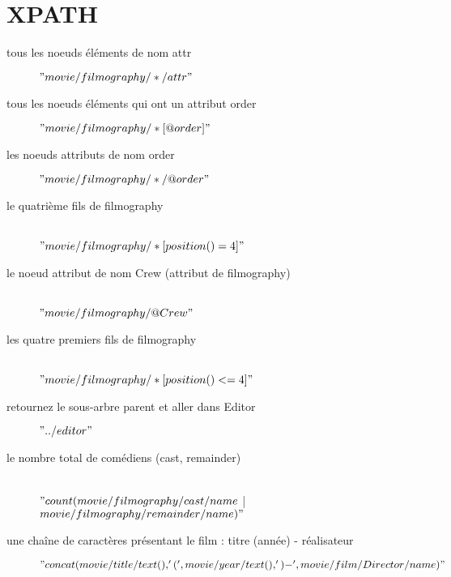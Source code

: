 \chapter{XPATH}

\begin{description}
\item[tous les noeuds éléments de nom attr] $"movie/filmography/*/attr"$
\item[tous les noeuds éléments qui ont un attribut order] $"movie/filmography/*[@order]"$
\item[les noeuds attributs de nom order] $"movie/filmography/*/@order"$
\item[le quatrième fils de filmography]\ \\ $"movie/filmography/*[position()=4]"$
\item[le noeud attribut de nom Crew (attribut de filmography)]\ \\ $"movie/filmography/@Crew"$
\item[les quatre premiers fils de filmography]\ \\ $"movie/filmography/*[position()<=4]"$
\item[retournez le sous-arbre parent et aller dans Editor] $"../editor"$
\item[le nombre total de comédiens (cast, remainder)]\ \\ $"count(movie/filmography/cast/name$ | $movie/filmography/remainder/name)"$
\item[une chaîne de caractères présentant le film : titre (année) - réalisateur]
    $"concat(movie/title/text(), ' (', movie/year/text(), ') - ', movie/film/Director/name)"$
\end{description}

\pagebreak